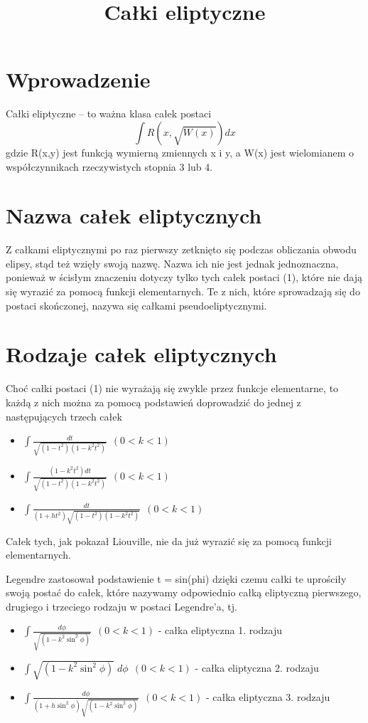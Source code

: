 \documentclass{article}
\begin{document}
\title{Całki eliptyczne}
\maketitle

\section*{Wprowadzenie}
Całki eliptyczne – to ważna klasa całek postaci
\begin{equation}
\int R(x,{\sqrt {W(x)}})dx
\end{equation}
gdzie R(x,y) jest funkcją wymierną zmiennych x i y, a W(x) jest wielomianem o współczynnikach rzeczywistych stopnia 3 lub 4.

\section*{Nazwa całek eliptycznych}
Z całkami eliptycznymi po raz pierwszy zetknięto się podczas obliczania obwodu elipsy, stąd też wzięły swoją nazwę. Nazwa ich nie jest jednak jednoznaczna, ponieważ w ścisłym znaczeniu dotyczy tylko tych całek postaci (1), które nie dają się wyrazić za pomocą funkcji elementarnych. Te z nich, które sprowadzają się do postaci skończonej, nazywa się całkami pseudoeliptycznymi. 

\section*{Rodzaje całek eliptycznych}
Choć całki postaci (1) nie wyrażają się zwykle przez funkcje elementarne, to każdą z nich można za pomocą podstawień doprowadzić do jednej z następujących trzech całek 
\begin{itemize}
\item $ \int {\frac {dt}{\sqrt {(1-t^{2})(1-k^{2}t^{2})}}}\ \ (0<k<1) $
\item $ \int {\frac {(1-k^{2}t^{2})dt}{\sqrt {(1-t^{2})(1-k^{2}t^{2})}}}\ \ (0<k<1) $
\item $ \int {\frac {dt}{(1+ht^{2}){\sqrt {(1-t^{2})(1-k^{2}t^{2})}}}}\ \ (0<k<1) $
\end{itemize}

Całek tych, jak pokazał Liouville, nie da już wyrazić się za pomocą funkcji elementarnych. 

Legendre zastosował podstawienie t = sin(phi) dzięki czemu całki te uprościły swoją postać do całek, które nazywamy odpowiednio całką eliptyczną pierwszego, drugiego i trzeciego rodzaju w postaci Legendre’a, tj. 
\begin{itemize}
\item \( \int {\frac {d\phi }{\sqrt {(1-k^{2}\sin ^{2}\phi )}}}\ \ (0<k<1) \) - całka eliptyczna 1. rodzaju
\item \( \int {\sqrt {(1-k^{2}\sin ^{2}\phi )}}\;d\phi \ \ (0<k<1) \) - całka eliptyczna 2. rodzaju
\item \( \int {\frac {d\phi }{(1+h\sin ^{2}\phi ){\sqrt {(1-k^{2}\sin ^{2}\phi )}}}}\ \ (0<k<1) \) - całka eliptyczna 3. rodzaju
\end{itemize}
\end{document}
